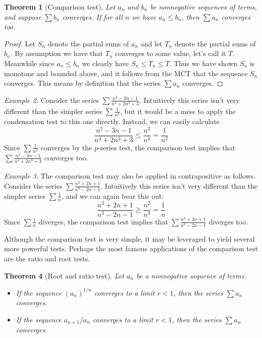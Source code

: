 \documentclass[11pt,oneside]{amsbook}
\theoremstyle{definition}
\theoremstyle{plain}
\newtheorem{theorem}{Theorem}[section]
\theoremstyle{definition}
\theoremstyle{remark}
\newtheorem{example}[theorem]{Example}
\numberwithin{equation}{section}
\numberwithin{figure}{section}
\begin{document}
\begin{theorem}[Comparison test]
  Let $a_n$ and $b_n$ be nonnegative sequences of terms, and suppose $\sum b_n$ converges. If for all $n$ we have $a_n\leq b_n$, then $\sum a_n$ converges too.
\end{theorem}

\begin{proof}
  Let $S_n$ denote the partial sums of $a_n$ and let $T_n$ denote the partial sums of $b_n$. By assumption we have that $T_n$ converges to some value, let's call it $T$. Meanwhile since $a_n\leq b_n$ we clearly have $S_n\leq T_n\leq T$. Thus we have shown $S_n$ is monotone and bounded above, and it follows from the MCT that the sequence $S_n$ converges. This means by definition that the series $\sum a_n$ converges.
\end{proof}

\begin{example}
  Consider the series $\sum\frac{n^2-3n-1}{n^4+2n^3+3}$. Intuitively this series isn't very different than the simpler series $\sum\frac{1}{n^2}$, but it would be a mess to apply the condensation test to this one directly. Instead, we can easily calculate
  \[\frac{n^2-3n-1}{n^4+2n^3+3}\leq\frac{n^2}{n^4}=\frac{1}{n^2}
  \]
  Since $\sum\frac{1}{n^2}$ converges by the $p$-series test, the comparison test implies that $\sum\frac{n^2-3n-1}{n^4+2n^3+3}$ converges too.
\end{example}

\begin{example}
  The comparison test may also be applied in contrapositive as follows. Consider the series $\sum\frac{n^2+2n+1}{n^3-2n-1}$. Intuitively this series isn't very different than the simpler series $\sum\frac1n$, and we can again bear this out:
  \[\frac{n^2+2n+1}{n^3-2n-1}\geq\frac{n^2}{n^3}=\frac1n
  \]
  Since $\sum\frac1n$ diverges, the comparison test implies that $\sum\frac{n^2+2n+1}{n^3-2n-1}$ diverges too.
\end{example}

Although the comparison test is very simple, it may be leveraged to yield several more powerful tests. Perhaps the most famous applications of the comparison test are the ratio and root tests.

\begin{theorem}[Root and ratio test]
  Let $a_n$ be a nonnegative sequence of terms.
  \begin{itemize}
  \item If the sequence $(a_n)^{1/n}$ converges to a limit $r<1$, then the series $\sum a_n$ converges.
  \item If the sequence $a_{n+1}/a_n$ converges to a limit $r<1$, then the series $\sum a_n$ converges.
  \end{itemize}
\end{theorem}
\end{document}
